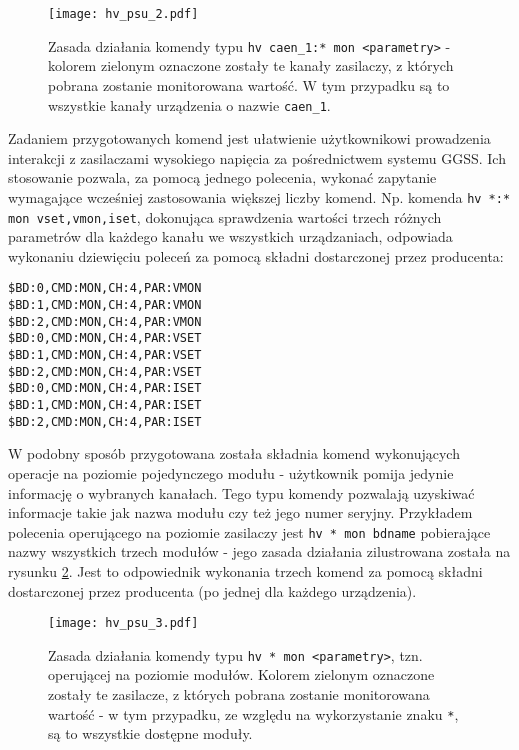 \begin{figure}[H]
\centering
\texttt{[image: hv\_psu\_2.pdf]}
\caption{Zasada działania komendy typu \lstinline{hv caen_1:* mon <parametry>} - kolorem zielonym oznaczone zostały te kanały zasilaczy, z których pobrana zostanie monitorowana wartość. W tym przypadku są to wszystkie kanały urządzenia o nazwie \lstinline{caen_1}.}
\label{fig:psu2}
\end{figure}

Zadaniem przygotowanych komend jest ułatwienie użytkownikowi prowadzenia interakcji z zasilaczami wysokiego napięcia za pośrednictwem systemu GGSS. Ich stosowanie pozwala, za pomocą jednego polecenia, wykonać zapytanie wymagające wcześniej zastosowania większej liczby komend. Np. komenda \lstinline{hv *:* mon vset,vmon,iset}, dokonująca sprawdzenia wartości trzech różnych parametrów dla każdego kanału we wszystkich urządzaniach, odpowiada wykonaniu dziewięciu poleceń za pomocą składni dostarczonej przez producenta:
\begin{lstlisting}
$BD:0,CMD:MON,CH:4,PAR:VMON
$BD:1,CMD:MON,CH:4,PAR:VMON
$BD:2,CMD:MON,CH:4,PAR:VMON
$BD:0,CMD:MON,CH:4,PAR:VSET
$BD:1,CMD:MON,CH:4,PAR:VSET
$BD:2,CMD:MON,CH:4,PAR:VSET
$BD:0,CMD:MON,CH:4,PAR:ISET
$BD:1,CMD:MON,CH:4,PAR:ISET
$BD:2,CMD:MON,CH:4,PAR:ISET
\end{lstlisting}

W podobny sposób przygotowana została składnia komend wykonujących operacje na poziomie pojedynczego modułu - użytkownik pomija jedynie informację o wybranych kanałach. Tego typu komendy pozwalają uzyskiwać informacje takie jak nazwa modułu czy też jego numer seryjny. Przykładem polecenia operującego na poziomie zasilaczy jest \lstinline{hv * mon bdname} pobierające nazwy wszystkich trzech modułów - jego zasada działania zilustrowana została na rysunku \ref{fig:psu3}. Jest to odpowiednik wykonania trzech komend za pomocą składni dostarczonej przez producenta (po jednej dla każdego urządzenia).

\begin{figure}[H]
\centering
\texttt{[image: hv\_psu\_3.pdf]}
\caption{Zasada działania komendy typu \lstinline{hv * mon <parametry>}, tzn. operującej na poziomie modułów. Kolorem zielonym oznaczone zostały te zasilacze, z których pobrana zostanie monitorowana wartość - w tym przypadku, ze względu na wykorzystanie znaku \lstinline{*}, są to wszystkie dostępne moduły.}
\label{fig:psu3}
\end{figure}

